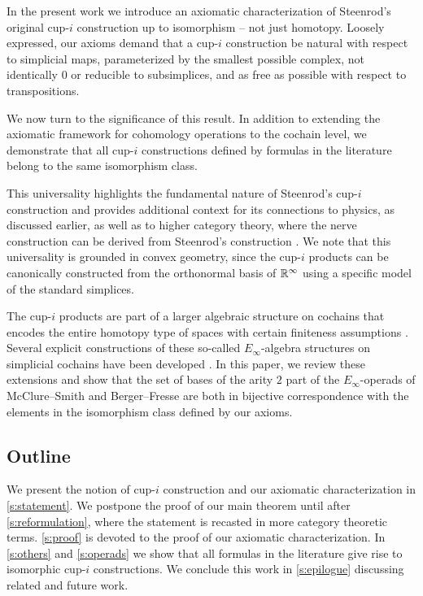 In the present work we introduce an axiomatic characterization of Steenrod's original cup-$i$ construction up to isomorphism -- not just homotopy.
Loosely expressed, our axioms demand that a cup-$i$ construction be natural with respect to simplicial maps, parameterized by the smallest possible complex, not identically $0$ or reducible to subsimplices, and as free as possible with respect to transpositions.

We now turn to the significance of this result.
In addition to extending the axiomatic framework for cohomology operations \cite{serre1053eilenberg_maclane, cartan1955iteration, steenrod1962cohomology} to the cochain level, we demonstrate that all cup-$i$ constructions defined by formulas in the literature \cite{steenrod1947products, real1996computability, mcclure2003multivariable, berger2004combinatorial, medina2020prop1, medina2023fast_sq} belong to the same isomorphism class.

This universality highlights the fundamental nature of Steenrod's cup-$i$ construction and provides additional context for its connections to physics, as discussed earlier, as well as to higher category theory, where the nerve construction can be derived from Steenrod's construction \cite{street1987orientals, medina2020globular}.
We note that this universality is grounded in convex geometry, since the cup-$i$ products can be canonically constructed from the orthonormal basis of $\mathbb{R}^\infty$ using a specific model of the standard simplices.

The cup-$i$ products are part of a larger algebraic structure on cochains that encodes the entire homotopy type of spaces with certain finiteness assumptions \cite{mandell2006homotopy_type}.
Several explicit constructions of these so-called $E_\infty$-algebra structures on simplicial cochains have been developed \cite{mcclure2003multivariable, berger2004combinatorial, medina2020prop1}.
In this paper, we review these extensions and show that the set of bases of the arity $2$ part of the $E_\infty$-operads of McClure--Smith and Berger--Fresse are both in bijective correspondence with the elements in the isomorphism class defined by our axioms.

\subsection*{Outline}

We present the notion of cup-$i$ construction and our axiomatic characterization in \cref{s:statement}.
We postpone the proof of our main theorem until after \cref{s:reformulation}, where the statement is recasted in more category theoretic terms.
\cref{s:proof} is devoted to the proof of our axiomatic characterization.
In \cref{s:others} and \cref{s:operads} we show that all formulas in the literature give rise to isomorphic \mbox{cup-$i$} constructions.
We conclude this work in \cref{s:epilogue} discussing related and future work.